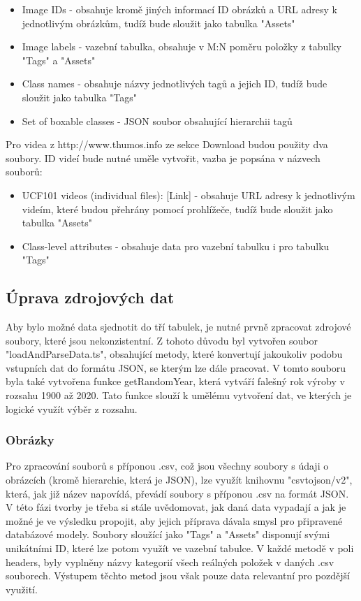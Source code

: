\begin{itemize}
\item Image IDs - obsahuje kromě jiných informací ID obrázků a URL adresy k jednotlivým obrázkům, tudíž bude sloužit jako tabulka "Assets"
\item Image labels - vazební tabulka, obsahuje v M:N poměru položky z tabulky "Tags" a "Assets"
\item Class names - obsahuje názvy jednotlivých tagů a jejich ID, tudíž bude sloužit jako tabulka "Tags"
\item Set of boxable classes - JSON soubor obsahující hierarchii tagů
\end{itemize}

Pro videa z http://www.thumos.info ze sekce Download budou použity dva soubory. ID videí bude nutné uměle vytvořit, vazba je popsána v názvech souborů:

\begin{itemize}
\item UCF101 videos (individual files): [Link] - obsahuje URL adresy k jednotlivým videím, které budou přehrány pomocí prohlížeče, tudíž bude sloužit jako tabulka "Assets"
\item Class-level attributes - obsahuje data pro vazební tabulku i pro tabulku "Tags"
\end{itemize}

\subsection{Úprava zdrojových dat}
Aby bylo možné data sjednotit do tří tabulek, je nutné prvně zpracovat zdrojové soubory, které jsou nekonzistentní. Z tohoto důvodu byl vytvořen soubor "loadAndParseData.ts", obsahující metody, které konvertují jakoukoliv podobu vstupních dat do formátu JSON, se kterým lze dále pracovat. V tomto souboru byla také vytvořena funkce getRandomYear, která vytváří falešný rok výroby v rozsahu 1900 až 2020. Tato funkce slouží k umělému vytvoření dat, ve kterých je logické využít výběr z rozsahu.

\subsubsection{Obrázky}
Pro zpracování souborů s příponou .csv, což jsou všechny soubory s údaji o obrázcích (kromě hierarchie, která je JSON), lze využít knihovnu "csvtojson/v2", která, jak již název napovídá, převádí soubory s příponou .csv na formát JSON. V této fázi tvorby je třeba si stále uvědomovat, jak daná data vypadají a jak je možné je ve výsledku propojit, aby jejich příprava dávala smysl pro připravené databázové modely. Soubory sloužící jako "Tags" a "Assets" disponují svými unikátními ID, které lze potom využít ve vazební tabulce. V každé metodě v poli headers, byly vyplněny názvy kategorií všech reálných položek v daných .csv souborech. Výstupem těchto metod jsou však pouze data relevantní pro pozdější využití.

